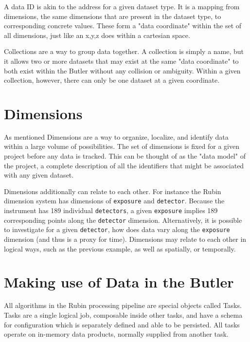 \documentclass[11pt,twoside]{article}
\begin{document}
A data ID is akin to the address for a given dataset type. It is a mapping from dimensions, the same dimensions that are present in the dataset type, to corresponding concrete values. These form a "data coordinate" within the set of all dimensions, just like an x,y,z does within a cartesian space.

Collections are a way to group data together. A collection is simply a name, but it allows two or more datasets that may exist at the same "data coordinate" to both exist within the Butler without any collision or ambiguity. Within a given collection, however, there can only be one dataset at a given coordinate.

\section{Dimensions}
As mentioned Dimensions are a way to organize, localize, and identify data within a large volume of possibilities. The set of dimensions is fixed for a given project before any data is tracked. This can be thought of as the "data model" of the project, a complete description of all the identifiers that might be associated with any given dataset.

Dimensions additionally can relate to each other. For instance the Rubin dimension system has dimensions of \texttt{exposure} and \texttt{detector}. Because the instrument has 189 individual \texttt{detectors}, a given \texttt{exposure} implies 189 corresponding points along the \texttt{detector} dimension. Alternatively, it is possible to investigate for a given \texttt{detector}, how does data vary along the \texttt{exposure} dimension (and thus is a proxy for time). Dimensions may relate to each other in logical ways, such as the previous example, as well as spatially, or temporally.

\section{Making use of Data in the Butler}
All algorithms in the Rubin processing pipeline are special objects called Tasks. Tasks are a single logical job, composable inside other tasks, and have a schema for configuration which is separately defined and able to be persisted. All tasks operate on in-memory data products, normally supplied from another task.
\end{document}
